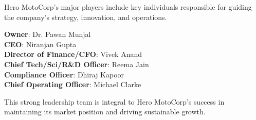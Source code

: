 Hero MotoCorp's major players include key individuals responsible for guiding the company's strategy, innovation, and operations.

\textbf{Owner}: Dr. Pawan Munjal \cite{heromotocorpBoardLeadership} \\
\textbf{CEO}: Niranjan Gupta\\
\textbf{Director of Finance/CFO}: Vivek Anand\\
\textbf{Chief Tech/Sci/R\&D Officer}: Reema Jain\\
\textbf{Compliance Officer}: Dhiraj Kapoor\\
\textbf{Chief Operating Officer}: Michael Clarke

This strong leadership team is integral to Hero MotoCorp's success in maintaining its market position and driving sustainable growth.